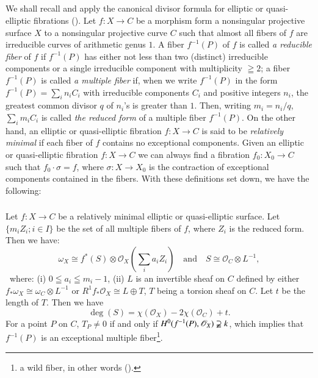 \subsection{}\label{chap3:2.3}
We shall recall and apply the canonical divisor formula for elliptic
or quasi-elliptic fibrations (\cf \cite{10}). Let $f:X\to C$ be a
morphism form a nonsingular projective surface $X$ to a nonsingular
projective curve $C$ such that almost all fibers of $f$ are
irreducible curves of arithmetic genus $1$. A fiber $f^{-1}(P)$ of $f$
is called {\em a reducible fiber} of $f$ if $f^{-1}(P)$ has either not
less than two (distinct) irreducible components or a single
irreducible component with multiplicity $\geqq 2$; a fiber $f^{-1}(P)$
is called {\em a multiple fiber} if, when we write $f^{-1}(P)$ in the
form $f^{-1}(P)={\displaystyle{\mathop{\sum}_{i}}}n_{i}C_{i}$ with
irreducible components $C_{i}$ and positive integers $n_{i}$, the
greatest common divisor $q$ of $n_{i}$'s is greater than $1$. Then,
writing $m_{i}=n_{i}/q$,
${\displaystyle{\mathop{\sum}_{i}}}m_{i}C_{i}$ is called {\em the
  reduced form} of a multiple fiber $f^{-1}(P)$. On the other hand, an
elliptic or quasi-elliptic fibration $f:X\to C$ is said to be {\em
  relatively minimal} if each fiber of $f$ contains no exceptional
components. Given an elliptic or quasi-elliptic fibration $f:X\to C$
we can always find a fibration $f_{0}:X_{0}\to C$ such that
$f_{0}\cdot\sigma=f$, where $\sigma:X\to X_{0}$ is the contraction of
exceptional components contained in the fibers. With these definitions
set down, we have the following:

\subsubsection{}\label{chap3:2.3.1}
\begin{lemma*}
  Let $f:X\to C$ be a relatively minimal elliptic or quasi-elliptic
  surface. Let $\{m_{i}Z_{i};i\in I\}$ be the set of all multiple fibers
  of $f$, where $Z_{i}$ is the reduced form. Then we have: 
  $$
  \omega_{X}\cong f^{\ast}(S)\otimes
  \mathscr{O}_{X}(\sum_{i}a_{i}Z_{i})\quad\text{and}\quad S\cong
  \mathscr{O}_{C}\otimes L^{-1},
  $$\pageoriginale\
  where: {\rm(i)} $0\leqq a_{i}\leqq m_{i}-1$, {\rm(ii)} $L$ is an
  invertible sheaf on $C$ defined by either $f_{\ast}\omega_{X}\cong
  \omega_{C}\otimes L^{-1}$ or $R^{1}f_{\ast}\mathscr{O}_{X}\cong
  L\oplus T$, $T$ being a torsion sheaf on $C$. Let $t$ be the length of
  $T$. Then we have 
  $$
  \deg (S)=\chi(\mathscr{O}_{X})-2\chi(\mathscr{O}_{C})+t.
  $$
  For a point $P$ on $C$, $T_{P}\neq 0$ if and only if
  $H^{0}(f^{-1}(P),\mathscr{O}_{X})\varsupsetneqq k$, which implies that
  $f^{-1}(P)$ is an exceptional multiple fiber\footnote{a wild fiber, in
    other words (\cf \cite{10}).}. 
\end{lemma*}

